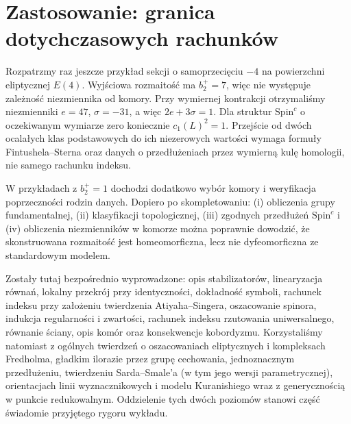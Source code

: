 \section{Zastosowanie: granica dotychczasowych rachunków}
\label{sec:tg-sw-what-next}

Rozpatrzmy raz jeszcze przykład sekcji o samoprzecięciu
$-4$ na powierzchni eliptycznej $E(4)$. Wyjściowa rozmaitość
ma $b_2^+=7$, więc nie występuje zależność niezmiennika od komory.
Przy wymiernej kontrakcji otrzymaliśmy niezmienniki
$e=47$, $\sigma=-31$, a więc $2e+3\sigma=1$.
Dla struktur $\mathrm{Spin}^c$ o oczekiwanym wymiarze zero
koniecznie $c_1(L)^2=1$. Przejście od dwóch ocalałych
klas podstawowych do ich niezerowych wartości wymaga
formuły Fintushela--Sterna oraz danych o przedłużeniach
przez wymierną kulę homologii, nie samego rachunku indeksu.

W przykładach z $b_2^+=1$ dochodzi dodatkowo
wybór komory i weryfikacja poprzeczności rodzin danych.
Dopiero po skompletowaniu: (i) obliczenia grupy fundamentalnej,
(ii) klasyfikacji topologicznej, (iii) zgodnych przedłużeń
$\mathrm{Spin}^c$ i (iv) obliczenia niezmienników w komorze
można poprawnie dowodzić, że skonstruowana rozmaitość
jest homeomorficzna, lecz nie dyfeomorficzna ze standardowym
modelem.

\begin{uwaga}
Zostały tutaj bezpośrednio wyprowadzone: opis stabilizatorów,
linearyzacja równań, lokalny przekrój przy identyczności,
dokładność symboli, rachunek indeksu przy założeniu
twierdzenia Atiyaha--Singera, oszacowanie spinora,
indukcja regularności i zwartości, rachunek indeksu
rzutowania uniwersalnego, równanie ściany,
opis komór oraz konsekwencje kobordyzmu.
Korzystaliśmy natomiast z ogólnych twierdzeń
o oszacowaniach eliptycznych i kompleksach Fredholma,
gładkim ilorazie przez grupę cechowania,
jednoznacznym przedłużeniu, twierdzeniu Sarda--Smale'a
(w tym jego wersji parametrycznej), orientacjach
linii wyznacznikowych i modelu Kuranishiego
wraz z generycznością w punkcie redukowalnym. Oddzielenie tych dwóch
poziomów stanowi część świadomie przyjętego rygoru wykładu.
\end{uwaga}


